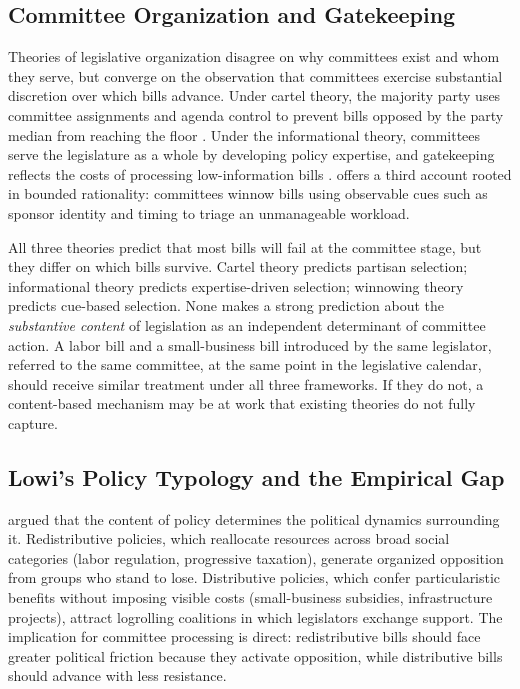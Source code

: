 \documentclass[11pt]{article}
\begin{document}
\subsection{Committee Organization and Gatekeeping}
\label{sec:lit-committee}

Theories of legislative organization disagree on why committees exist and whom they serve, but converge on the observation that committees exercise substantial discretion over which bills advance. Under cartel theory, the majority party uses committee assignments and agenda control to prevent bills opposed by the party median from reaching the floor \citep{cox2005}. Under the informational theory, committees serve the legislature as a whole by developing policy expertise, and gatekeeping reflects the costs of processing low-information bills \citep{krehbiel1991}. \citet{krutz2005} offers a third account rooted in bounded rationality: committees winnow bills using observable cues such as sponsor identity and timing to triage an unmanageable workload.

All three theories predict that most bills will fail at the committee stage, but they differ on which bills survive. Cartel theory predicts partisan selection; informational theory predicts expertise-driven selection; winnowing theory predicts cue-based selection. None makes a strong prediction about the \emph{substantive content} of legislation as an independent determinant of committee action. A labor bill and a small-business bill introduced by the same legislator, referred to the same committee, at the same point in the legislative calendar, should receive similar treatment under all three frameworks. If they do not, a content-based mechanism may be at work that existing theories do not fully capture.

\subsection{Lowi's Policy Typology and the Empirical Gap}
\label{sec:lit-lowi}

\citet{lowi1964} argued that the content of policy determines the political dynamics surrounding it. Redistributive policies, which reallocate resources across broad social categories (labor regulation, progressive taxation), generate organized opposition from groups who stand to lose. Distributive policies, which confer particularistic benefits without imposing visible costs (small-business subsidies, infrastructure projects), attract logrolling coalitions in which legislators exchange support. The implication for committee processing is direct: redistributive bills should face greater political friction because they activate opposition, while distributive bills should advance with less resistance.
\end{document}
